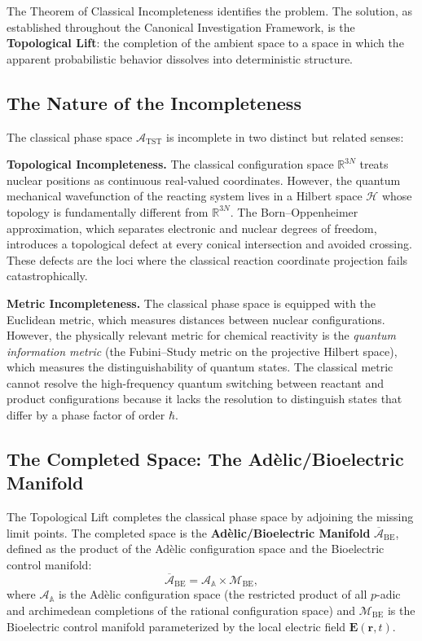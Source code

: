 \documentclass[11pt,openany]{extbook}
\theoremstyle{plain}
\theoremstyle{definition}
\begin{document}
\noindent The Theorem of Classical Incompleteness identifies the problem. The solution, as established throughout the Canonical Investigation Framework, is the \textbf{Topological Lift}: the completion of the ambient space to a space in which the apparent probabilistic behavior dissolves into deterministic structure.

\subsection{The Nature of the Incompleteness}

\noindent The classical phase space $\mathcal{A}_{\mathrm{TST}}$ is incomplete in two distinct but related senses:

\noindent \textbf{Topological Incompleteness.} The classical configuration space $\mathbb{R}^{3N}$ treats nuclear positions as continuous real-valued coordinates. However, the quantum mechanical wavefunction of the reacting system lives in a Hilbert space $\mathcal{H}$ whose topology is fundamentally different from $\mathbb{R}^{3N}$. The Born--Oppenheimer approximation, which separates electronic and nuclear degrees of freedom, introduces a topological defect at every conical intersection and avoided crossing. These defects are the loci where the classical reaction coordinate projection fails catastrophically.

\noindent \textbf{Metric Incompleteness.} The classical phase space is equipped with the Euclidean metric, which measures distances between nuclear configurations. However, the physically relevant metric for chemical reactivity is the \emph{quantum information metric} (the Fubini--Study metric on the projective Hilbert space), which measures the distinguishability of quantum states. The classical metric cannot resolve the high-frequency quantum switching between reactant and product configurations because it lacks the resolution to distinguish states that differ by a phase factor of order $\hbar$.

\subsection{The Completed Space: The Adèlic/Bioelectric Manifold}

\noindent The Topological Lift completes the classical phase space by adjoining the missing limit points. The completed space is the \textbf{Adèlic/Bioelectric Manifold} $\overline{\mathcal{A}}_{\mathrm{BE}}$, defined as the product of the Adèlic configuration space and the Bioelectric control manifold:
\[
\overline{\mathcal{A}}_{\mathrm{BE}} = \mathcal{A}_{\mathbb{A}} \times \mathcal{M}_{\mathrm{BE}},
\]
where $\mathcal{A}_{\mathbb{A}}$ is the Adèlic configuration space (the restricted product of all $p$-adic and archimedean completions of the rational configuration space) and $\mathcal{M}_{\mathrm{BE}}$ is the Bioelectric control manifold parameterized by the local electric field $\mathbf{E}(\mathbf{r}, t)$.
\end{document}

